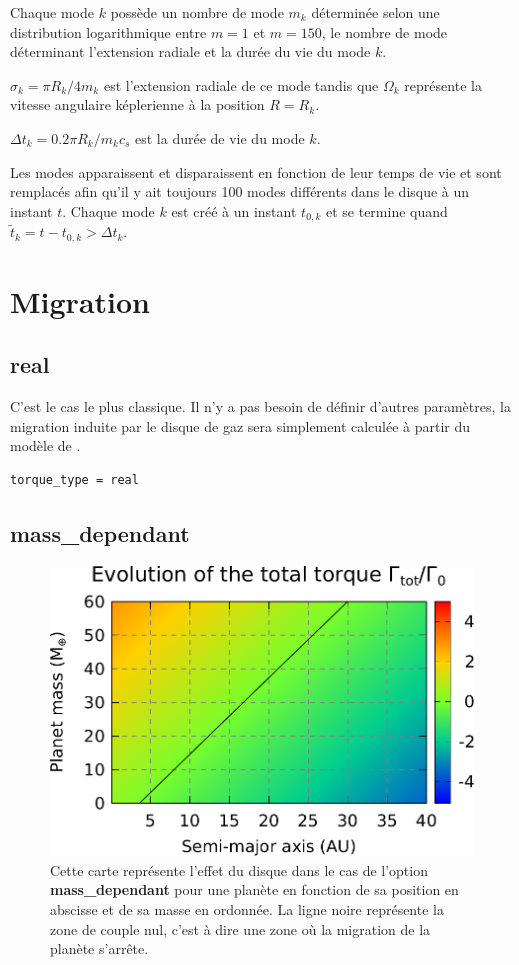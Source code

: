 Chaque mode $k$ possède un nombre de mode $m_k$ déterminée selon une distribution logarithmique entre $m=1$ et $m=150$, le nombre de mode déterminant l'extension radiale et la durée du vie du mode $k$.

$\sigma_k = \pi R_k / 4m_k$ est l'extension radiale de ce mode tandis que $\Omega_k$ représente la vitesse angulaire képlerienne à la position $R=R_k$.

$\Delta t_k=0.2\pi R_k / m_k c_s$ est la durée de vie du mode $k$. 

\bigskip

Les modes apparaissent et disparaissent en fonction de leur temps de vie et sont remplacés afin qu'il y ait toujours 100 modes différents dans le disque à un instant $t$. Chaque mode $k$ est créé à un instant $t_{0,k}$ et se termine quand $\tilde{t}_k = t-t_{0,k} > \Delta t_k$.

\section{Migration}
\subsection{real}
C'est le cas le plus classique. Il n'y a pas besoin de définir d'autres paramètres, la migration induite par le disque de gaz sera simplement calculée à partir du modèle de \cite{paardekooper2011torque}.

\begin{verbatim}
torque_type = real
\end{verbatim}

\subsection{mass\_dependant}\label{sec:mass_dependant}
\begin{figure}[htb]
\centering
\includegraphics[width=0.65\linewidth]{figure/migration_map/mass_dependant.pdf}
\caption{Cette carte représente l'effet du disque dans le cas de l'option \textbf{mass\_dependant} pour une planète en fonction de sa position en abscisse et de sa masse en ordonnée. La ligne noire représente la zone de couple nul, c'est à dire une zone où la migration de la planète s'arrête.}
\end{figure}

